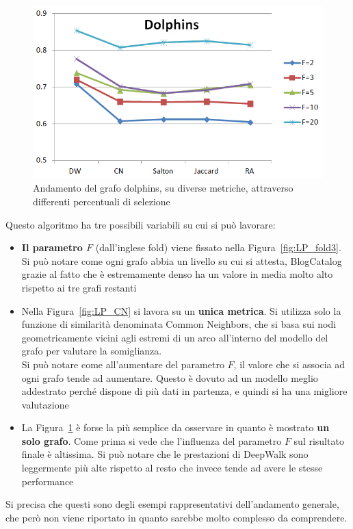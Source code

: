 %
\begin{figure}[htp]
	\centering
	\includegraphics[width=\linewidth]{immagini/LP_Dolphins}
	\caption{Andamento del grafo dolphins, su diverse metriche, attraverso differenti percentuali di selezione}
	\label{fig:LP_Dolphins}
\end{figure}
%
Questo algoritmo ha tre possibili variabili su cui si può lavorare:
\begin{itemize}
	\item \textbf{Il parametro $F$} (dall'inglese fold) viene fissato nella Figura~\ref{fig:LP_fold3}. Si può notare come ogni grafo abbia un livello su cui si attesta, BlogCatalog grazie al fatto che è estremamente denso ha un valore in media molto alto rispetto ai tre grafi restanti
	\item Nella Figura~\ref{fig:LP_CN} si lavora su un \textbf{unica metrica}. Si utilizza solo la funzione di similarità denominata Common Neighbors, che si basa sui nodi geometricamente vicini agli estremi di un arco all'interno del modello del grafo per valutare la somiglianza.\\
	Si può notare come all'aumentare del parametro $F$, il valore che si associa ad ogni grafo tende ad aumentare. Questo è dovuto ad un modello meglio addestrato perché dispone di più dati in partenza, e quindi si ha una migliore valutazione
	\item La Figura~\ref{fig:LP_Dolphins} è forse la più semplice da osservare in quanto è mostrato \textbf{un solo grafo}. Come prima si vede che l'influenza del parametro $F$ sul risultato finale è altissima. Si può notare che le prestazioni di DeepWalk sono leggermente più alte rispetto al resto che invece tende ad avere le stesse performance 
\end{itemize}
Si precisa che questi sono degli esempi rappresentativi dell'andamento generale, che però non viene riportato in quanto sarebbe molto complesso da comprendere.
%
